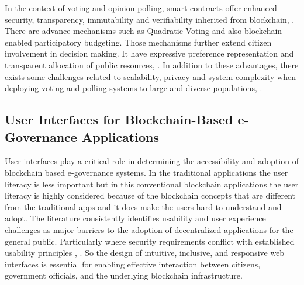 
In the context of voting and opinion polling, smart contracts offer enhanced security, transparency, immutability and verifiability inherited from blockchain\cite{ResearchGate_2024_ScalableEVoting}, \cite{IEEE_2024_BPVot}. There are advance mechanisms such as Quadratic Voting and also blockchain enabled participatory budgeting. Those mechanisms further extend citizen involvement in decision making. It have expressive preference representation and transparent allocation of public resources\cite{ResearchGate_2021_QuadraticVoting}, \cite{UPSpace_2022_ParticipatoryBudgeting}. In addition to these advantages, there exists some challenges related to scalability, privacy and system complexity when deploying voting and polling systems to large and diverse populations\cite{ResearchGate_2024_ScalableEVoting}, \cite{JournalOfCybersecurity_2020_BlockchainVoting}.

\subsection{User Interfaces for Blockchain-Based e-Governance Applications}

User interfaces play a critical role in determining the accessibility and adoption of blockchain based e-governance systems. In the traditional applications the user literacy is less important but in this conventional blockchain applications the user literacy is highly considered because of the blockchain concepts that are different from the traditional apps and it does make the users hard to understand and adopt. The literature consistently identifies usability and user experience challenges as major barriers to the adoption of decentralized applications for the general public. Particularly where security requirements conflict with established usability principles \cite{mdpi2025usercentric}, \cite{sonule2025uxweb3}. So the design of intuitive, inclusive, and responsive web interfaces is essential for enabling effective interaction between citizens, government officials, and the underlying blockchain infrastructure.

